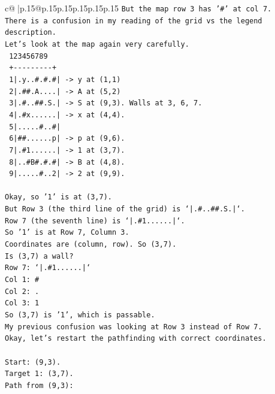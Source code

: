 \documentclass{article}
\begin{document}
{\begin{supertabular}{c@{$\;$}|p{.15\linewidth}@{}p{.15\linewidth}p{.15\linewidth}p{.15\linewidth}p{.15\linewidth}p{.15\linewidth}}
{{{\texttt{But the map row 3 has '\#' at col 7.} \\
\texttt{There is a confusion in my reading of the grid vs the legend description.} \\
\texttt{Let's look at the map again very carefully.} \\
\texttt{   123456789} \\
\texttt{  +{-}{-}{-}{-}{-}{-}{-}{-}{-}+} \\
\texttt{ 1|.y..\#.\#.\#|  {-}> y at (1,1)} \\
\texttt{ 2|.\#\#.A....|  {-}> A at (5,2)} \\
\texttt{ 3|.\#..\#\#.S.|  {-}> S at (9,3). Walls at 3, 6, 7.} \\
\texttt{ 4|.\#x......|  {-}> x at (4,4).} \\
\texttt{ 5|.....\#..\#|} \\
\texttt{ 6|\#\#......p|  {-}> p at (9,6).} \\
\texttt{ 7|.\#1......|  {-}> 1 at (3,7).} \\
\texttt{ 8|..\#B\#.\#.\#|  {-}> B at (4,8).} \\
\texttt{ 9|.....\#..2|  {-}> 2 at (9,9).} \\
\\ 
\texttt{Okay, so '1' is at (3,7).} \\
\texttt{But Row 3 (the third line of the grid) is `|.\#..\#\#.S.|`.} \\
\texttt{Row 7 (the seventh line) is `|.\#1......|`.} \\
\texttt{So '1' is at Row 7, Column 3.} \\
\texttt{Coordinates are (column, row). So (3,7).} \\
\texttt{Is (3,7) a wall?} \\
\texttt{Row 7: `|.\#1......|`} \\
\texttt{Col 1: \#} \\
\texttt{Col 2: .} \\
\texttt{Col 3: 1} \\
\texttt{So (3,7) is '1', which is passable.} \\
\texttt{My previous confusion was looking at Row 3 instead of Row 7.} \\
\texttt{Okay, let's restart the pathfinding with correct coordinates.} \\
\\ 
\texttt{Start: (9,3).} \\
\texttt{Target 1: (3,7).} \\
\texttt{Path from (9,3):} \\
}}}
\end{supertabular}}
\end{document}
